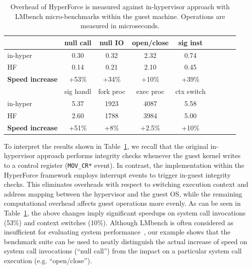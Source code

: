 \begin{table}[htdp]
\begin{center}
\begin{tabular}{| l | c | c | c | c | c | c | c | c |  }
\hline
  ~            & null call  & null IO & open/close & sig inst   \\  
\hline
in-hyper & 0.30 & 0.32 & 2.32 & 0.74   \\
HF    & 0.14 & 0.21 & 2.10 & 0.45  \\  
\hline
\bf{Speed increase}      &  +53\%   & +34\%    &  +10\%    & +39\%      \\
\hline
\hline

~ & sig handl & fork proc & exec proc & ctx switch \\
\hline
in-hyper 			& 5.37 & 1923 & 4087 & 5.58 \\
HF 		& 2.60 & 1788 & 3984 & 5.00 \\

\hline
\bf{Speed increase}			& +51\%    & +8\%       & +2.5\%     &  +10\% \\
\hline

\end{tabular}
\caption{Overhead of HyperForce is measured against in-hypervisor approach with
LMbench micro-benchmarks within the guest machine. Operations are measured in microseconds.}
\vspace{0.3cm}
\end{center}
\label{guestmicro}
\end{table}%



To interpret the results shown in Table~\ref{guestmicro}, we recall that the original in-hypervisor approach performs integrity checks whenever the guest kernel writes to a control register (\texttt{MOV\_CR*} event). 
%
In contrast, the implementation within the HyperForce framework employs interrupt events to trigger in-guest integrity checks. This eliminates overheads with respect to switching execution context and address mapping between the hypervisor and the guest OS, while the remaining computational overhead affects guest operations more evenly. As can be seen in Table~\ref{guestmicro}, the above changes imply significant speedups on system call invocations (53\%) and context switches (10\%). Although LMbench is often considered as insufficient for evaluating system performance~\cite{lmbenchevil}, our example shows that the benchmark suite can be used to neatly distinguish the actual increase of speed on system call invocations (\enquote{null call}) from the impact on a particular system call execution (e.g. \enquote{open/close}).

